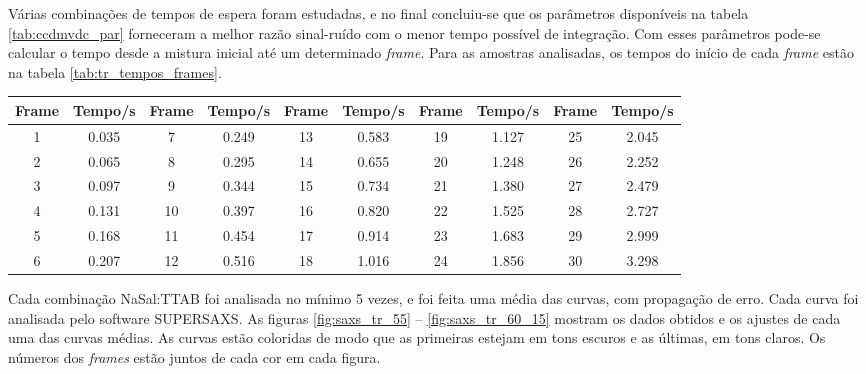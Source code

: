 	Várias combinações de tempos de espera foram estudadas, e no final concluiu-se que os parâmetros disponíveis na tabela \ref{tab:ccdmvdc_par} forneceram a melhor razão sinal-ruído com o menor tempo possível de integração. Com esses parâmetros pode-se calcular o tempo desde a mistura inicial até um determinado \emph{frame}. Para as amostras analisadas, os tempos do início de cada \emph{frame} estão na tabela \ref{tab:tr_tempos_frames}.
	
				\begin{table}[h]
		{%
			\begin{tabular}{c c | c c | c c | c c | c c}
				\toprule
				Frame & Tempo/s & Frame & Tempo/s & Frame & Tempo/s & Frame & Tempo/s & Frame & Tempo/s \\ \midrule
				  1   & 0.035   & 7     & 0.249   & 13    & 0.583   & 19    & 1.127   & 25    & 2.045   \\
				  2   & 0.065   & 8     & 0.295   & 14    & 0.655   & 20    & 1.248   & 26    & 2.252   \\
				  3   & 0.097   & 9     & 0.344   & 15    & 0.734   & 21    & 1.380   & 27    & 2.479   \\
				  4   & 0.131   & 10    & 0.397   & 16    & 0.820   & 22    & 1.525   & 28    & 2.727   \\
				  5   & 0.168   & 11    & 0.454   & 17    & 0.914   & 23    & 1.683   & 29    & 2.999   \\
				  6   & 0.207   & 12    & 0.516   & 18    & 1.016   & 24    & 1.856   & 30    & 3.298	\\ \bottomrule
			\end{tabular}
		}{}
	\end{table}  
	
	Cada combinação NaSal:TTAB foi analisada no mínimo 5 vezes, e foi feita uma média das curvas, com propagação de erro. Cada curva foi analisada pelo software SUPERSAXS. As figuras \ref{fig:saxs_tr_55} -- \ref{fig:saxs_tr_60_15} mostram os dados obtidos e os ajustes de cada uma das curvas médias. As curvas estão coloridas de modo que as primeiras estejam em tons escuros e as últimas, em tons claros. Os números dos \emph{frames} estão juntos de cada cor em cada figura.
	
